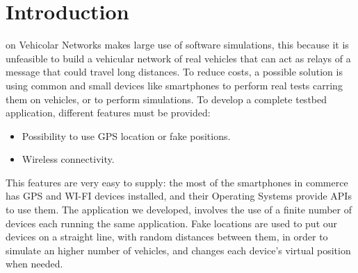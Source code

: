 \section{Introduction}
% 
% 
% 
% 
 on Vehicolar Networks makes large use of software simulations, this because it is unfeasible to build a vehicular network of real vehicles that can act as relays of a message that could travel long distances.
To reduce costs, a possible solution is using common and small devices like smartphones to perform real tests carring them on vehicles, or to perform simulations.
To develop a complete testbed application, different features must be provided:
\begin{itemize}
	\item Possibility to use GPS location or fake positions.
	\item Wireless connectivity.
\end{itemize}

This features are very easy to supply: the most of the smartphones in commerce has GPS and WI-FI devices installed, and their Operating Systems provide APIs to use them.
The application we developed, involves the use of a finite number of devices each running the same application. Fake locations are used to put our devices on a straight line, with random distances between them, in order to simulate an higher number of vehicles, and changes each device's virtual position when needed.
